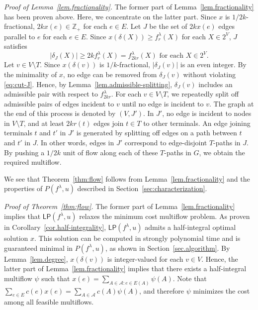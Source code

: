 \documentclass{article}
\newcommand{\Afam}{\mathcal{A}}
\newcommand{\Zset}{\mathbb{Z}}
\newcommand{\cut}{P}
\newcommand{\lp}{\mathsf{LP}}
\newcommand{\g}{f^{\lambda}}
\begin{document}
{\em Proof of Lemma~\ref{lem.fractionality}.}
The former part of Lemma~\ref{lem.fractionality} has been proven above.
Here, we concentrate on the latter part.
Since $x$ is $1/2k$-fractional, $2kx(e) \in \Zset_+$ for each $e \in E$.
Let $J$ be the set of $2kx(e)$ edges parallel to $e$ for each $e\in E$.
Since $x(\delta(X)) \geq \g_r(X)$ for each $X \in 2^V$,
$J$ satisfies 
\begin{equation}\label{eq:cut-J}
|\delta_J(X)| \geq 2k \g_{r}(X)=\g_{2kr}(X) \text{ for each } X \in 2^V.
\end{equation}
Let $v \in V\setminus T$. Since $x(\delta(v))$ is $1/k$-fractional, $|\delta_J(v)|$ is an even integer. 
By the minimality of $x$,
no edge can be removed from $\delta_J(v)$ without violating
\eqref{eq:cut-J}.
Hence, by Lemma~\ref{lem.admissible-splitting}, $\delta_J(v)$ includes an admissible pair
with respect to $\g_{2kr}$.
For each $v \in V \setminus T$,
we repeatedly split off admissible pairs of edges incident to $v$
until no edge is incident to $v$.
The graph at the end of this process is denoted by $(V,J')$.
In $J'$, no edge is incident to nodes in $V\setminus T$, and 
at least $2kr(t)$ edges join $t \in T$ to other terminals.
An edge joining terminals $t$ and $t'$ in $J'$ is generated by
splitting off edges on a path between $t$ and $t'$ in $J$.
In other words, edges in $J'$ correspond to edge-disjoint $T$-paths in $J$.
By pushing a $1/2k$ unit of flow along each of these $T$-paths in $G$,
we obtain the required multiflow.
\qquad\endproof

We see that Theorem~\ref{thm:flow} follows from
Lemma~\ref{lem.fractionality} and the properties of $\cut(\g,u)$ 
described in Section~\ref{sec:characterization}.

{\em Proof of Theorem~\ref{thm:flow}.}
The former part of Lemma~\ref{lem.fractionality} 
implies that $\lp(\g,u)$ relaxes the minimum cost multiflow problem.
As proven in Corollary~\ref{cor.half-integrality},
$\lp(\g,u)$ admits a half-integral optimal solution $x$. 
This solution can be computed in strongly polynomial time
and is guaranteed minimal in $\cut(\g,u)$, as shown in Section~\ref{sec.algorithm}.
By Lemma~\ref{lem.degree}, $x(\delta(v))$ is integer-valued for each $v \in V$.
Hence, the latter part of Lemma~\ref{lem.fractionality} implies that 
there exists a half-integral multiflow $\psi$
such that $x(e)=\sum_{A \in \Afam: e \in E(A)} \psi(A)$.
Note that $\sum_{e \in E}c(e)x(e)=\sum_{A \in \Afam}c(A)\psi(A)$, and therefore $\psi$ minimizes
the cost among all feasible multiflows.
\end{document}

